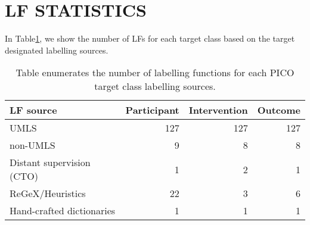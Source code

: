 \documentclass[10.7pt,]{article}
\begin{document}
\section{LF STATISTICS}\label{lss}
%
In Table\ref{tab:lf_stat}, we show the number of LFs for each target class based on the target designated labelling sources.
%
\begin{table}[ht]
    \centering
    \begin{tabular}{|l|r|r|r|}
    \hline
        LF source & Participant & Intervention & Outcome \\ \hline
        UMLS & 127 & 127 & 127 \\ 
        non-UMLS & 9 & 8 & 8 \\ 
        Distant supervision (CTO) & 1 & 2 & 1 \\ 
        ReGeX/Heuristics & 22 & 3 & 6 \\ 
        Hand-crafted dictionaries & 1 & 1 & 1 \\ 
         \hline
    \end{tabular}
    \caption{\label{tab:lf_stat} Table enumerates the number of labelling functions for each PICO target class labelling sources.}
\end{table}
%
%
%
\end{document}
